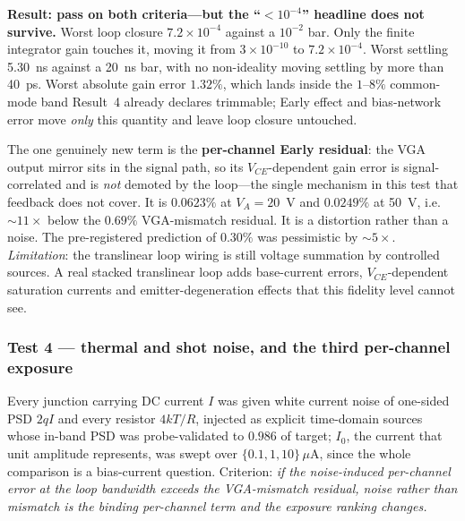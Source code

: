 \documentclass[11pt]{article}
\begin{document}
\textbf{Result: pass on both criteria---but the ``$<10^{-4}$'' headline does not survive.} Worst loop closure $7.2\times10^{-4}$ against a $10^{-2}$ bar. Only the finite integrator gain touches it, moving it from $3\times10^{-10}$ to $7.2\times10^{-4}$. Worst settling 5.30~ns against a 20~ns bar, with no non-ideality moving settling by more than 40~ps. Worst absolute gain error $1.32\%$, which lands inside the $1$--$8\%$ common-mode band Result~4 already declares trimmable; Early effect and bias-network error move \textit{only} this quantity and leave loop closure untouched.

The one genuinely new term is the \textbf{per-channel Early residual}: the VGA output mirror sits in the signal path, so its $V_{CE}$-dependent gain error is signal-correlated and is \textit{not} demoted by the loop---the single mechanism in this test that feedback does not cover. It is $0.0623\%$ at $V_A = 20$~V and $0.0249\%$ at 50~V, i.e.\ ${\sim}11\times$ below the $0.69\%$ VGA-mismatch residual. It is a distortion rather than a noise. The pre-registered prediction of $0.30\%$ was pessimistic by ${\sim}5\times$. \textit{Limitation}: the translinear loop wiring is still voltage summation by controlled sources. A real stacked translinear loop adds base-current errors, $V_{CE}$-dependent saturation currents and emitter-degeneration effects that this fidelity level cannot see.

\subsubsection{Test 4 --- thermal and shot noise, and the third per-channel exposure}
\label{sec:noise}

Every junction carrying DC current $I$ was given white current noise of one-sided PSD $2qI$ and every resistor $4kT/R$, injected as explicit time-domain sources whose in-band PSD was probe-validated to $0.986$ of target; $I_0$, the current that unit amplitude represents, was swept over $\{0.1, 1, 10\}\,\mu$A, since the whole comparison is a bias-current question. Criterion: \textit{if the noise-induced per-channel error at the loop bandwidth exceeds the VGA-mismatch residual, noise rather than mismatch is the binding per-channel term and the exposure ranking changes.}
\end{document}
